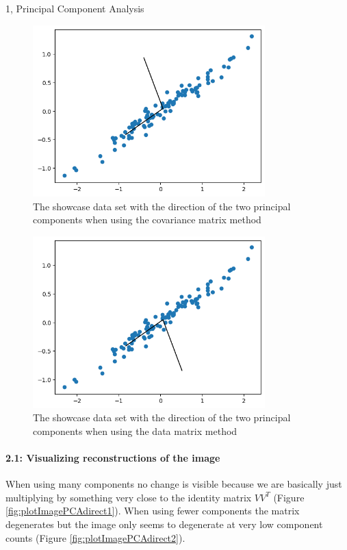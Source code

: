 \begin{task}{1, Principal Component Analysis}
\begin{figure}[H]
    \centering
    \includegraphics[width=0.8\textwidth]{images/plot2dPCA.png}
    \caption{The showcase data set with the direction of the two principal components when using the covariance matrix method}
    \label{fig:plot2dPCA}
\end{figure}

\begin{figure}[H]
    \centering
    \includegraphics[width=0.8\textwidth]{images/direct2d.png}
    \caption{The showcase data set with the direction of the two principal components when using the data matrix method}
    \label{fig:direct2d}
\end{figure}

\paragraph{2.1: Visualizing reconstructions of the image}

When using many components no change is visible because we are basically just multiplying by something very close to the identity matrix $VV^T$ (Figure \ref{fig:plotImagePCAdirect1}).
When using fewer components the matrix degenerates but the image only seems to degenerate at very low component counts (Figure \ref{fig:plotImagePCAdirect2}).


\end{task}
